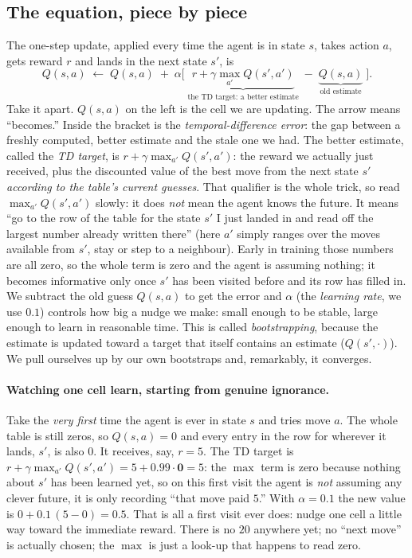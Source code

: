 \documentclass[11pt]{article}
\newcommand{\key}[1]{\textit{#1}}            %
\begin{document}
\subsection{The equation, piece by piece}

The one-step update, applied every time the agent is in state $s$, takes action $a$, gets
reward $r$ and lands in the next state $s'$, is
\begin{equation}
Q(s,a)\;\leftarrow\;Q(s,a)\;+\;\alpha\Big[\;\underbrace{r+\gamma\max_{a'}Q(s',a')}_{\text{the TD target: a better estimate}}\;-\;\underbrace{Q(s,a)}_{\text{old estimate}}\;\Big].
\label{eq:qupdate}
\end{equation}
Take it apart. $Q(s,a)$ on the left is the cell we are updating. The arrow means ``becomes.''
Inside the bracket is the \key{temporal-difference error}: the gap between a freshly
computed, better estimate and the stale one we had. The better estimate, called the
\key{TD target}, is $r + \gamma \max_{a'} Q(s',a')$: the reward we actually just received,
plus the discounted value of the best move from the next state $s'$ \emph{according to the
table's current guesses}. That qualifier is the whole trick, so read $\max_{a'} Q(s',a')$
slowly: it does \emph{not} mean the agent knows the future. It means ``go to the row of the
table for the state $s'$ I just landed in and read off the largest number already written
there'' (here $a'$ simply ranges over the moves available from $s'$, stay or step to a
neighbour). Early in training those numbers are all zero, so the whole term is zero and the
agent is assuming nothing; it becomes informative only once $s'$ has been visited before and
its row has filled in. We subtract the old guess $Q(s,a)$ to get the error and $\alpha$ (the
\key{learning rate}, we use $0.1$) controls how big a nudge we make: small enough to be
stable, large enough to learn in reasonable time. This is called \key{bootstrapping}, because
the estimate is updated toward a target that itself contains an estimate ($Q(s',\cdot)$). We
pull ourselves up by our own bootstraps and, remarkably, it converges.

\paragraph{Watching one cell learn, starting from genuine ignorance.} Take the \emph{very
first} time the agent is ever in state $s$ and tries move $a$. The whole table is still
zeros, so $Q(s,a)=0$ and every entry in the row for wherever it lands, $s'$, is also $0$. It
receives, say, $r=5$. The TD target is $r+\gamma\max_{a'}Q(s',a') = 5 + 0.99\cdot\mathbf{0} =
5$: the $\max$ term is zero because nothing about $s'$ has been learned yet, so on this first
visit the agent is \emph{not} assuming any clever future, it is only recording ``that move
paid $5$.'' With $\alpha=0.1$ the new value is $0 + 0.1\,(5-0) = 0.5$. That is all a first
visit ever does: nudge one cell a little way toward the immediate reward. There is no
$20$ anywhere yet; no ``next move'' is actually chosen; the $\max$ is just a look-up that
happens to read zero.
\end{document}
